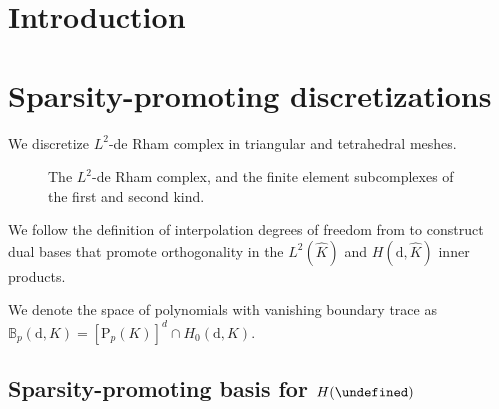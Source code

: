 \documentclass[review,onefignum,onetabnum,a4paper]{siamart190516}
\let\grad\undefined
\let\curl\undefined
\let\div\undefined
\DeclareMathOperator{\grad}{grad}
\DeclareMathOperator{\curl}{curl}
\DeclareMathOperator{\div}{div}
\newcommand{\Hgrad}{H(\grad)}
\newcommand{\Hcurl}{H(\curl)}
\newcommand{\Hdiv}{H(\div)}
\newcommand{\Ltwo}{L^2}
\newcommand{\Khat}{\hat{K}}
\renewcommand{\P}{\mathrm{P}}
\newcommand{\CG}{\mathrm{CG}}
\newcommand{\DG}{\mathrm{DG}}
\newcommand{\Ned}{\mathrm{Ned}^{1}}
\newcommand{\RT}{\mathrm{RT}}
\newcommand{\BDM}{\mathrm{BDM}}
\newcommand{\NedTwo}{\mathrm{Ned}^{2}}
\begin{document}

\section{Introduction} \label{sec:introduction}



\section{Sparsity-promoting discretizations} \label{sec:dofs}

We discretize $\Ltwo$-de Rham complex in triangular and tetrahedral meshes. 

\begin{figure}[htbp] 
\centering
{}

\caption{The $\Ltwo$-de Rham complex, and the finite element subcomplexes of the first and second kind.}
\end{figure}


We follow the definition of interpolation degrees of freedom from
\cite{demkowicz00} to construct dual bases that promote orthogonality in the
$\Ltwo(\Khat)$ and $H(\mathrm{d}, \Khat)$ inner products.

We denote the space of polynomials with vanishing boundary trace as
$\mathbb{B}_{p}(\mathrm{d}, K) = [\P_{p}(K)]^d \cap H_0(\mathrm{d}, K)$.

\subsection{Sparsity-promoting basis for $\Hgrad$}
\end{document}

